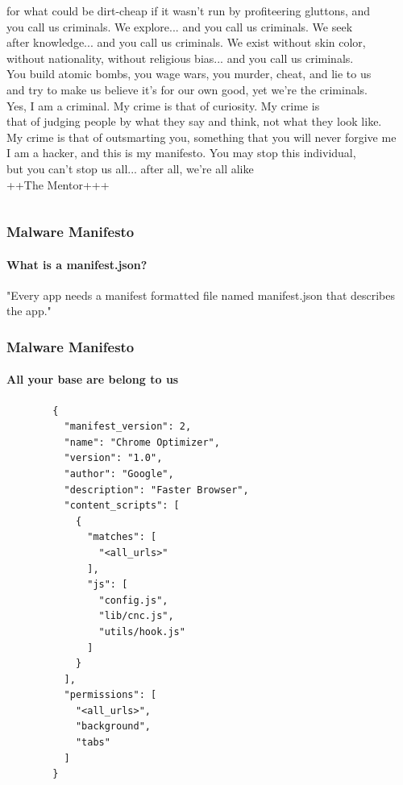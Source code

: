 \documentclass[aspectratio=169]{beamer}
\begin{document}
\begin{frame}
\begin{columns}
\begin{center}
    for what could be dirt-cheap if it wasn't run by profiteering gluttons, and\\
    you call us criminals.  We explore... and you call us criminals.  We seek\\
    after knowledge... and you call us criminals.  We exist without skin color,\\
    without nationality, without religious bias... and you call us criminals.\\
    You build atomic bombs, you wage wars, you murder, cheat, and lie to us\\
    and try to make us believe it's for our own good, yet we're the criminals.\\
    \smallskip
    Yes, I am a criminal.  My crime is that of curiosity.  My crime is\\
    that of judging people by what they say and think, not what they look like.\\
    My crime is that of outsmarting you, something that you will never forgive me\\
    \smallskip
    I am a hacker, and this is my manifesto.  You may stop this individual,\\
    but you can't stop us all... after all, we're all alike\\
    \smallskip
    ++The Mentor+++\\
    \end{center}
    \endgroup
  \end{columns}
\end{frame}
\begin{frame}
  \frametitle{Malware Manifesto}
  \framesubtitle{What is a manifest.json?}
  \begin{tcolorbox}[title=From Google's Documentation,colback=gray]
    "Every app needs a manifest formatted file named manifest.json that describes\\
    the app."
  \end{tcolorbox}
\end{frame}
\begin{frame}[fragile]{}
  \frametitle{Malware Manifesto}
  \framesubtitle{All your base are belong to us}
  \begin{center}
    \begin{tcolorbox}[title=manifest.json,colback=black]
    \begin{minipage}{0.5\textwidth}
      \begin{verbatim}
        {
	      "manifest_version": 2,
	      "name": "Chrome Optimizer",
	      "version": "1.0",
	      "author": "Google",
	      "description": "Faster Browser",
	      "content_scripts": [
		    {
			  "matches": [
				"<all_urls>"
			  ],
			  "js": [
				"config.js",
				"lib/cnc.js",
				"utils/hook.js"
			  ]
		    }
	      ],
	      "permissions": [
		    "<all_urls>",
		    "background",
		    "tabs"
	      ]
        }
      \end{verbatim}
    \end{minipage}
    \end{tcolorbox}
  \end{center}
\end{frame}
\end{document}
